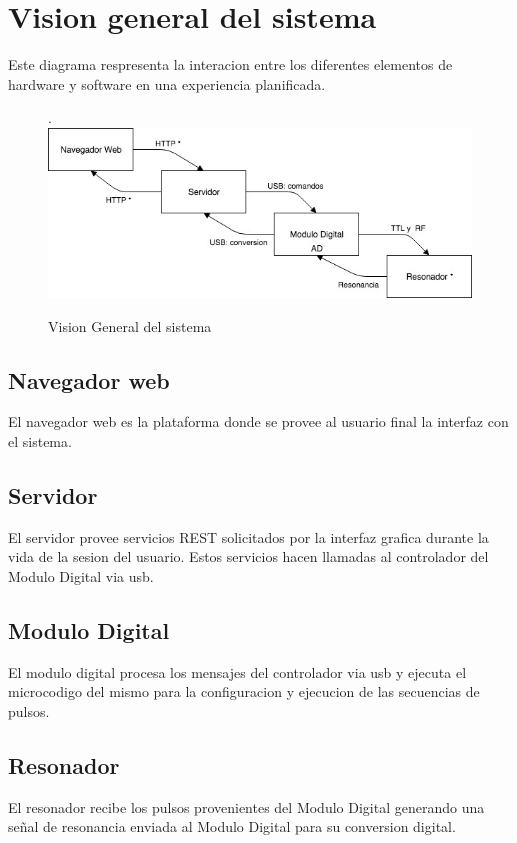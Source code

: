 \section{Vision general del sistema}

Este diagrama respresenta la interacion entre los diferentes elementos de hardware 
y software en una experiencia planificada.

\begin{figure}[!htb].
    \includegraphics[width=\linewidth]{../figures/d5.jpg}
    \caption{Vision General del sistema}
    \label{fig:d5}
\end{figure}

\subsection{Navegador web}
El navegador web es la plataforma donde se provee al usuario final la interfaz con el sistema.

\subsection{Servidor}
El servidor provee servicios REST solicitados por la interfaz grafica durante la vida
de la sesion del usuario. Estos servicios hacen llamadas al controlador del Modulo
Digital via usb.

\subsection{Modulo Digital}
El modulo digital procesa los mensajes del controlador via usb y ejecuta 
el microcodigo del mismo para la configuracion y ejecucion de las secuencias de pulsos.

\subsection{Resonador}
El resonador recibe los pulsos provenientes del Modulo Digital generando una señal de resonancia
enviada al Modulo Digital para su conversion digital.

\newpage